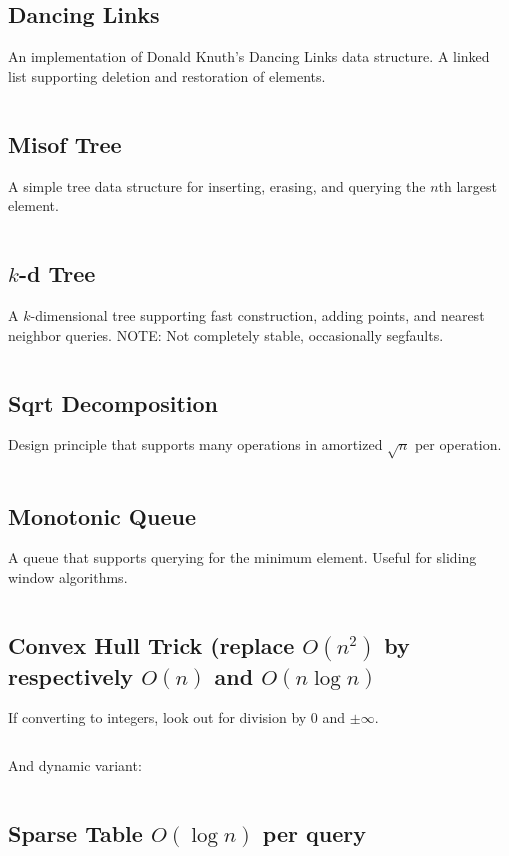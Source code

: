 \documentclass[8pt,a4paper,landscape,oneside]{amsart}
\newcommand{\mintedstyle}[2]{\inputminted[fontsize=\normalsize,baselinestretch=.9,breaklines,tabsize=2]{#1}{code/#2}}
\newcommand{\code}[1]{\mintedstyle{cpp}{#1}}
\begin{document}
\begin{multicols*}{3}
\subsection{Dancing Links}
An implementation of Donald Knuth's Dancing Links data structure. A
linked list supporting deletion and restoration of elements.
\code{datastructures/dancing_links.cpp}

\subsection{Misof Tree}
A simple tree data structure for inserting, erasing, and querying the
$n$th largest element.
\code{datastructures/misof_tree.cpp}

\subsection{$k$-d Tree}
A $k$-dimensional tree supporting fast construction, adding points, and
nearest neighbor queries.
NOTE: Not completely stable, occasionally segfaults.
\code{datastructures/kd_tree.cpp}

\subsection{Sqrt Decomposition}
Design principle that supports many operations in amortized $\sqrt{n}$ per operation.
\code{datastructures/sqrt_decomposition.cpp}

\subsection{Monotonic Queue}
A queue that supports querying for the minimum element. Useful for sliding window algorithms.
\code{datastructures/monotonic_queue.cpp}

\subsection{Convex Hull Trick (replace $O(n^2)$ by respectively $O(n)$ and $O(n\log n)$}
If converting to integers, look out for division by 0 and $\pm\infty$.
\code{datastructures/convex_hull_trick.cpp}
And dynamic variant:
\code{datastructures/convex_hull_trick_dynamic.cpp}

\subsection{Sparse Table $O(\log n)$ per query}
\code{datastructures/sparse_table.cpp}


\end{multicols*}
\end{document}
